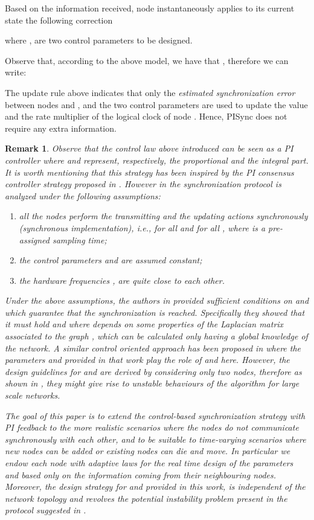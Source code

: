 \documentclass[english,a4paper,10pt,final]{article}
\numberwithin{equation}{section}
\numberwithin{figure}{section}
\newtheorem{remark}{Remark}
\begin{document}
Based on the information received, node  instantaneously applies to its current state  the following correction

where ,  are two control parameters to be designed.

Observe that, according to the above model, we have that , therefore we can write:


The update rule above indicates that only the \textit{estimated synchronization error}  between nodes  and , and the two control parameters  are used to update the value and the rate multiplier of the logical clock of node . Hence, PISync does not require any extra information.

\begin{remark}
Observe that the control law above introduced can be seen as a PI controller where  and  represent, respectively, the proportional and the integral part. It is worth mentioning that this strategy has been inspired by the PI consensus controller strategy proposed in \cite{Carli_2011}. However in \cite{Carli_2011} the synchronization protocol is analyzed under the following assumptions:
\begin{enumerate}
\item all the nodes perform the transmitting and the updating actions synchronously (\emph{synchronous implementation}), i.e.,  for all  and for all , where  is a pre-assigned sampling time;
\item the control parameters  and  are assumed constant;
\item the hardware frequencies ,  are quite close to each other.
\end{enumerate}

Under the above assumptions, the authors in \cite{Carli_2011} provided sufficient conditions on  and  which guarantee that the synchronization is reached. Specifically they showed that it must hold  and  where  depends on some properties of the Laplacian matrix associated to the graph , which can be calculated only having a global knowledge of the network. A similar control oriented approach has been proposed in \cite{Chen:10} where the parameters  and  provided in that work  play the role of  and  here. However, the design guidelines for   and  are derived by considering only two nodes, therefore as shown in \cite{Carli_2011}, they might give rise to unstable behaviours of the algorithm for large scale networks. 

The goal of this paper is to extend the control-based synchronization strategy with PI feedback to the more realistic scenarios where the nodes do not communicate synchronously with each other, and to be suitable to time-varying scenarios where new nodes can be added or existing nodes can die and move. In particular we endow each node with adaptive laws for  the real time design of the parameters  and  based only on the information coming from their neighbouring nodes. Moreover, the design strategy for  and  provided in this work, is independent of the network topology and revolves the potential instability problem present in the protocol suggested in \cite{Chen:10}.

\end{remark}
\end{document}
